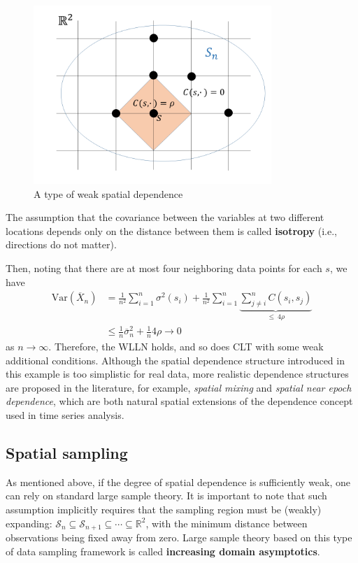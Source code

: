 \documentclass[10.5pt, A4paper, openany, uplatex]{book}
\newcommand{\mcl}{\mathcal}
\newcommand{\mbb}{\mathbb}
\newcommand{\Var}{\mathrm{Var}}
\renewcommand{\bar}{\overline}
\numberwithin{equation}{section}
\begin{document}
\begin{figure}[h!]
	\begin{center}
		\includegraphics[width = 9cm]{sprnd.png}
		\caption{A type of weak spatial dependence}
	\end{center}
\end{figure}

The assumption that the covariance between the variables at two different locations depends only on the distance between them is called \textbf{isotropy} (i.e., directions do not matter).

Then, noting that there are at most four neighboring data points for each $s$, we have
\begin{align*}
	\Var(\bar X_n) 
	& = \frac{1}{n^2}\sum_{i=1}^n \sigma^2(s_i) + \frac{1}{n^2}\sum_{i = 1}^n \underbrace{\sum_{j \neq i}^n C(s_i, s_j)}_{\le \: 4\rho} \\
	& \le \frac{1}{n}\bar{\sigma}_n^2 + \frac{1}{n} 4 \rho \to 0
\end{align*}
as $n \to \infty$.
Therefore, the WLLN holds, and so does CLT with some weak additional conditions.
Although the spatial dependence structure introduced in this example is too simplistic for real data, more realistic dependence structures are proposed in the literature, for example, \textit{spatial mixing} and \textit{spatial near epoch dependence}, which are both natural spatial extensions of the dependence concept used in time series analysis.

\subsection{Spatial sampling}
 
 As mentioned above, if the degree of spatial dependence is sufficiently weak, one can rely on standard large sample theory.
It is important to note that such assumption implicitly requires that the sampling region must be (weakly) expanding: $\mcl{S}_n \subseteq \mcl{S}_{n + 1} \subseteq \cdots \subseteq \mbb{R}^2$, with the minimum distance between observations being fixed away from zero.
Large sample theory based on this type of data sampling framework is called \textbf{increasing domain asymptotics}.
\end{document}
